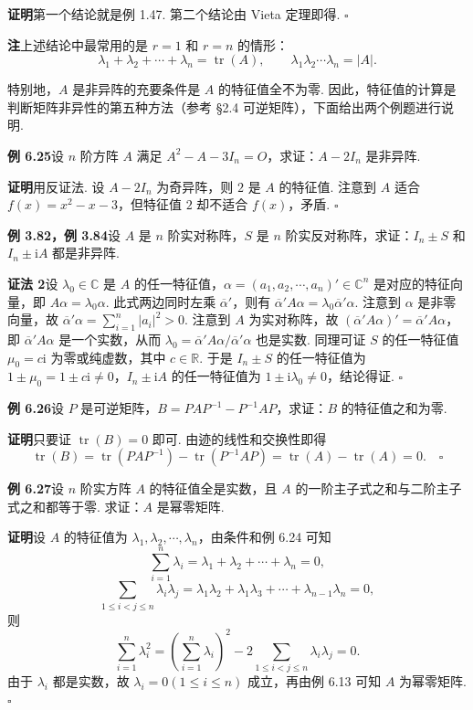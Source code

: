 \documentclass[UTF8, 12pt, fontset=fandol, oneside]{ctexart}
\begin{document}
\noindent\textbf{证明}\quad 第一个结论就是例 1.47. 第二个结论由 Vieta 定理即得. $\square$

\noindent\textbf{注}\quad 上述结论中最常用的是 $r=1$ 和 $r=n$ 的情形：
\[
\lambda_1+\lambda_2+\cdots+\lambda_n=\operatorname{tr}(A),\qquad
\lambda_1\lambda_2\cdots\lambda_n=|A|.
\]

特别地，$A$ 是非异阵的充要条件是 $A$ 的特征值全不为零. 因此，特征值的计算是判断矩阵非异性的第五种方法（参考 §2.4 可逆矩阵），下面给出两个例题进行说明.

\noindent\textbf{例 6.25}\quad 设 $n$ 阶方阵 $A$ 满足 $A^2-A-3I_n=O$，求证：$A-2I_n$ 是非异阵.

\noindent\textbf{证明}\quad 用反证法. 设 $A-2I_n$ 为奇异阵，则 $2$ 是 $A$ 的特征值. 注意到 $A$ 适合 $f(x)=x^2-x-3$，但特征值 $2$ 却不适合 $f(x)$，矛盾. $\square$

\noindent\textbf{例 3.82，例 3.84}\quad 设 $A$ 是 $n$ 阶实对称阵，$S$ 是 $n$ 阶实反对称阵，求证：$I_n\pm S$ 和 $I_n\pm \mathrm{i}A$ 都是非异阵.

\noindent\textbf{证法 2}\quad 设 $\lambda_0\in\mathbb{C}$ 是 $A$ 的任一特征值，$\alpha=(a_1,a_2,\cdots,a_n)'\in\mathbb{C}^n$ 是对应的特征向量，即 $A\alpha=\lambda_0\alpha$. 此式两边同时左乘 $\overline{\alpha}'$，则有 $\overline{\alpha}'A\alpha=\lambda_0\overline{\alpha}'\alpha$. 注意到 $\alpha$ 是非零向量，故 $\overline{\alpha}'\alpha=\sum_{i=1}^n|a_i|^2>0$. 注意到 $A$ 为实对称阵，故 $(\overline{\alpha}'A\alpha)'=\overline{\alpha}'A\alpha$，即 $\overline{\alpha}'A\alpha$ 是一个实数，从而 $\lambda_0=\overline{\alpha}'A\alpha/\overline{\alpha}'\alpha$ 也是实数. 同理可证 $S$ 的任一特征值 $\mu_0=c\mathrm{i}$ 为零或纯虚数，其中 $c\in\mathbb{R}$. 于是 $I_n\pm S$ 的任一特征值为 $1\pm \mu_0=1\pm c\mathrm{i}\ne 0$，$I_n\pm \mathrm{i}A$ 的任一特征值为 $1\pm \mathrm{i}\lambda_0\ne 0$，结论得证. $\square$

\noindent\textbf{例 6.26}\quad 设 $P$ 是可逆矩阵，$B=PAP^{-1}-P^{-1}AP$，求证：$B$ 的特征值之和为零.

\noindent\textbf{证明}\quad 只要证 $\operatorname{tr}(B)=0$ 即可. 由迹的线性和交换性即得
\[
\operatorname{tr}(B)=\operatorname{tr}(PAP^{-1})-\operatorname{tr}(P^{-1}AP)
=\operatorname{tr}(A)-\operatorname{tr}(A)=0. \quad \square
\]

\noindent\textbf{例 6.27}\quad 设 $n$ 阶实方阵 $A$ 的特征值全是实数，且 $A$ 的一阶主子式之和与二阶主子式之和都等于零. 求证：$A$ 是幂零矩阵.

\noindent\textbf{证明}\quad 设 $A$ 的特征值为 $\lambda_1,\lambda_2,\cdots,\lambda_n$，由条件和例 6.24 可知
\[
\sum_{i=1}^n\lambda_i=\lambda_1+\lambda_2+\cdots+\lambda_n=0,
\]
\[
\sum_{1\le i<j\le n}\lambda_i\lambda_j
=\lambda_1\lambda_2+\lambda_1\lambda_3+\cdots+\lambda_{n-1}\lambda_n=0,
\]
则
\[
\sum_{i=1}^n\lambda_i^2
=\left(\sum_{i=1}^n\lambda_i\right)^2
-2\sum_{1\le i<j\le n}\lambda_i\lambda_j=0.
\]
由于 $\lambda_i$ 都是实数，故 $\lambda_i=0(1\le i\le n)$ 成立，再由例 6.13 可知 $A$ 为幂零矩阵. $\square$
\end{document}
